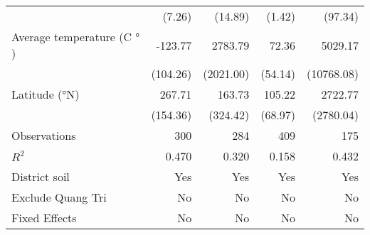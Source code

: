 {\begin{tabular}{l*{4}{D{.}{.}{-1}}}
                    &      (7.26)         &     (14.89)         &      (1.42)         &     (97.34)         \\
\addlinespace
Average temperature (C $°$)&     -123.77         &     2783.79         &       72.36         &     5029.17         \\
                    &    (104.26)         &   (2021.00)         &     (54.14)         &  (10768.08)         \\
\addlinespace
Latitude (°N)       &      267.71\sym{*}  &      163.73         &      105.22         &     2722.77         \\
                    &    (154.36)         &    (324.42)         &     (68.97)         &   (2780.04)         \\
\midrule
Observations        &         300         &         284         &         409         &         175         \\
\(R^{2}\)           &       0.470         &       0.320         &       0.158         &       0.432         \\
District soil       &         Yes         &         Yes         &         Yes         &         Yes         \\
Exclude Quang Tri   &          No         &          No         &          No         &          No         \\
Fixed Effects       &          No         &          No         &          No         &          No         \\
\bottomrule
\end{tabular}
}
